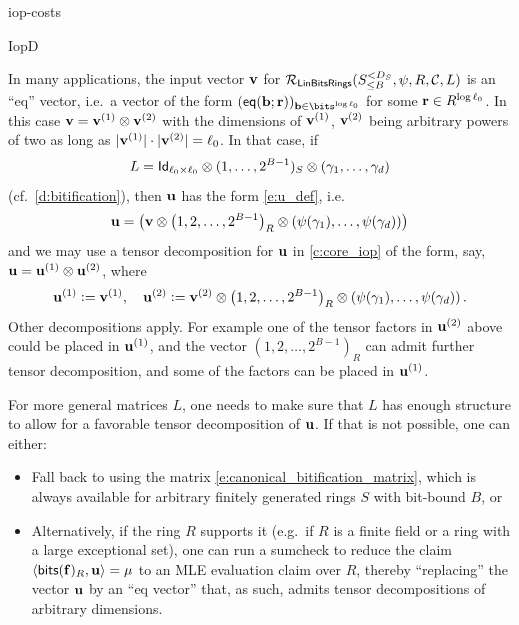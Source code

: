 \begin{lncsappendix}{iop-costs}
\begin{lncsmove}{IopD}
\begin{remark}
In many applications, the input vector $\mathbf{v}$ for $\mathcal{R}_{\mathsf{LinBitsRings}}({S_{\leq B}^{<D_S}},\psi, R,  \mathcal{C}, L)$ is an ``eq'' vector, i.e.\ a vector of the form $(\eq(\bb;\rr))_{\bb\in\bits^{\log\codedim_0}}$ for some $\mathbf{r}\in R^{\log \ell_0}$. In this case  $\mathbf{v}=\mathbf{v}^{(1)}\otimes \mathbf{v}^{(2)}$ with the dimensions of $\mathbf{v}^{(1)}$, $\mathbf{v}^{(2)}$ being arbitrary powers of two as long as $|\mathbf{v}^{(1)}|\cdot |\mathbf{v}^{(2)}|=\ell_0$. In that case, if \begin{equation}\label{e:canonical_bitification_matrix}L=\mathsf{Id}_{\ell_0\times \ell_0} \otimes (1,\ldots, 2^{B-1})_S\otimes (\gamma_1,\ldots, \gamma_d)\end{equation} (cf.\ \cref{d:bitification}), then $\mathbf{u}$ has the form \eqref{e:u_def}, i.e.\ $$ \mathbf{u} =   \left(\mathbf{v} \otimes \left(1, 2, \ldots, 2^{B-1}\right)_R \otimes \left(\psi(\gamma_1), \ldots, \psi(\gamma_{d})\right)\right) $$ and we may use a tensor decomposition for $\mathbf{u}$ in \cref{c:core_iop} of the form, say, $\mathbf{u}=\mathbf{u}^{(1)}\otimes \mathbf{u}^{(2)}$, where
%
$$
\mathbf{u}^{(1)} {\;\vcentcolon=\;} \mathbf{v}^{(1)},\quad \mathbf{u}^{(2)}{\;\vcentcolon=\;} \mathbf{v}^{(2)}\otimes \left(1, 2, \ldots, 2^{B-1}\right)_R \otimes \left(\psi(\gamma_1), \ldots, \psi(\gamma_{d})\right).
$$
Other decompositions apply. For example one of the tensor factors in $\mathbf{u}^{(2)}$ above could be placed in $\mathbf{u}^{(1)}$, and the vector  $\left(1, 2, \ldots, 2^{B-1}\right)_R$ can admit further tensor decomposition, and some of the factors can be placed in $\mathbf{u}^{(1)}$.

%
For more general matrices $L$, one needs to make sure that $L$ has enough structure to allow for a favorable tensor decomposition of $\mathbf{u}$. If that is not possible, one  can either: 
\begin{itemize}
[leftmargin=*,nosep]
\item Fall back to using the matrix \eqref{e:canonical_bitification_matrix}, which is always available for arbitrary finitely generated rings $S$ with bit-bound $B$, or
\item Alternatively, if the ring $R$ supports it (e.g.\ if $R$ is a finite field or a ring with a large exceptional set), one can run a sumcheck to reduce the claim $\langle \mathsf{bits}(\mathbf{f})_R, \mathbf{u}\rangle = \mu$ to an MLE evaluation claim over $R$, thereby ``replacing'' the vector $\mathbf{u}$ by an ``eq vector'' that, as such, admits tensor decompositions of arbitrary dimensions.
\end{itemize}
\end{remark}


\end{lncsmove}
\end{lncsappendix}
